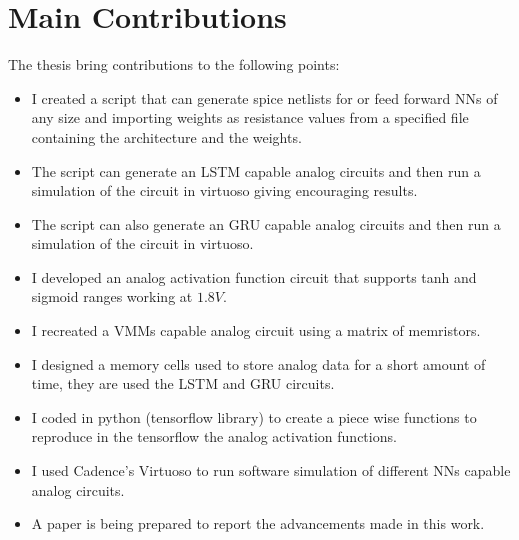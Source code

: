 \section{Main Contributions}
\label{sec:contributions}

The thesis bring contributions to the following points:

\begin{itemize}
  \item I created a script that can generate spice netlists for  or feed forward \aclp{NN} of any size and importing weights as resistance values from a specified file containing the architecture and the weights.
  \item The script can generate an \ac{LSTM} capable analog circuits and then run a simulation of the circuit in virtuoso giving encouraging results.
  \item The script can also generate an \ac{GRU} capable analog circuits and then run a simulation of the circuit in virtuoso.
  \item I developed an analog activation function circuit that supports \ac{tanh} and sigmoid ranges working at $1.8V$.
  \item I recreated a \acp{VMM} capable analog circuit using a matrix of memristors.
  \item I designed a memory cells used to store analog data for a short amount of time, they are used the \ac{LSTM} and \ac{GRU} circuits.
  \item I coded in python \cite{python} (tensorflow library\cite{tensorflow}) to create a piece wise functions to reproduce in the tensorflow the analog activation functions.
  \item I used Cadence's Virtuoso to run software simulation of different \acp{NN} capable analog circuits.
  \item A paper is being prepared to report the advancements made in this work.
\end{itemize}


